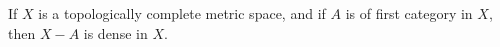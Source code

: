 If $X$ is a topologically complete metric space, and if $A$ is of first category in $X$, then $X - A$ is dense in $X$.
